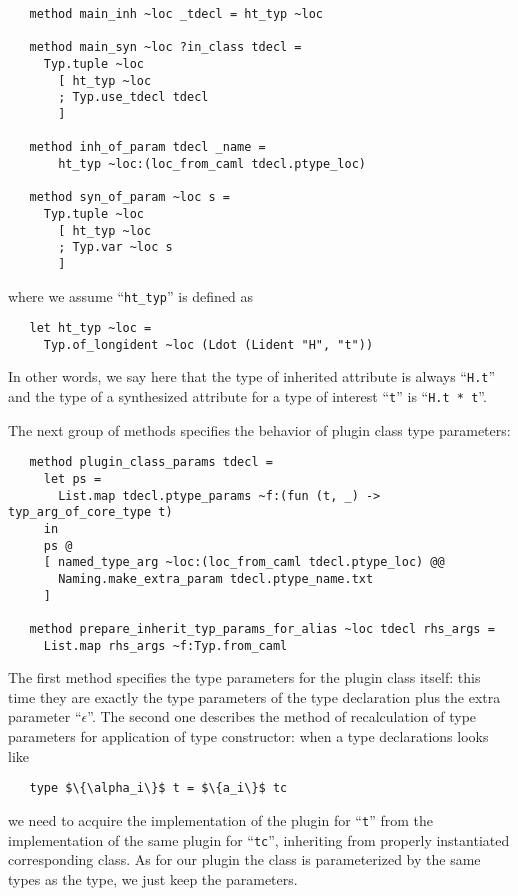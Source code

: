 \begin{lstlisting}
   method main_inh ~loc _tdecl = ht_typ ~loc

   method main_syn ~loc ?in_class tdecl =
     Typ.tuple ~loc
       [ ht_typ ~loc
       ; Typ.use_tdecl tdecl
       ]

   method inh_of_param tdecl _name =
       ht_typ ~loc:(loc_from_caml tdecl.ptype_loc)

   method syn_of_param ~loc s =
     Typ.tuple ~loc
       [ ht_typ ~loc
       ; Typ.var ~loc s
       ]
\end{lstlisting}

where we assume ``\lstinline{ht_typ}'' is defined as

\begin{lstlisting}
   let ht_typ ~loc =
     Typ.of_longident ~loc (Ldot (Lident "H", "t"))
\end{lstlisting}

In other words, we say here that the type of inherited attribute is always ``\lstinline{H.t}'' and the type of a synthesized attribute for
a type of interest ``\lstinline{t}'' is ``\lstinline{H.t * t}''.

The next group of methods specifies the behavior of plugin class type parameters:

\begin{lstlisting}
   method plugin_class_params tdecl =
     let ps =
       List.map tdecl.ptype_params ~f:(fun (t, _) -> typ_arg_of_core_type t)
     in
     ps @
     [ named_type_arg ~loc:(loc_from_caml tdecl.ptype_loc) @@
       Naming.make_extra_param tdecl.ptype_name.txt
     ]

   method prepare_inherit_typ_params_for_alias ~loc tdecl rhs_args =
     List.map rhs_args ~f:Typ.from_caml
\end{lstlisting}

The first method specifies the type parameters for the plugin class itself: this time they are exactly the type parameters of the type declaration plus
the extra parameter ``$\epsilon$''. The second one describes the method of recalculation of type parameters for application of type constructor: when
a type declarations looks like

\begin{lstlisting}
   type $\{\alpha_i\}$ t = $\{a_i\}$ tc
\end{lstlisting}

we need to acquire the implementation of the plugin for ``\lstinline{t}'' from the implementation of the same plugin for ``\lstinline{tc}'', inheriting
from properly instantiated corresponding class. As for our plugin the class is parameterized by the same types as the type, we just keep the parameters.

